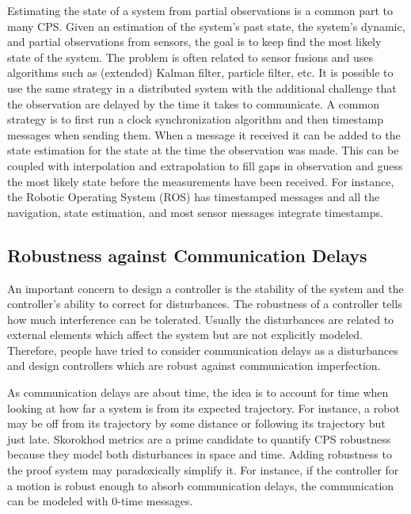 \documentclass[
graybox,
envcountchap
]{svmult}
\begin{document}
\begin{bibunit}
    Estimating the state of a system from partial observations is a common part to many CPS.
    Given an estimation of the system's past state, the system's dynamic, and partial observations from sensors, the goal is to keep find the most likely state of the system.
    The problem is often related to sensor fusions and uses algorithms such as (extended) Kalman filter, particle filter, etc.
    It is possible to use the same strategy in a distributed system with the additional challenge that the observation are delayed by the time it takes to communicate.
    A common strategy is to first run a clock synchronization algorithm and then timestamp messages when sending them.
    When a message it received it can be added to the state estimation for the state at the time the observation was made.
    This can be coupled with interpolation and extrapolation to fill gaps in observation and guess the most likely state before the measurements have been received.
    For instance, the Robotic Operating System (ROS) \cite{ROS} has timestamped messages and all the navigation, state estimation, and most sensor messages integrate timestamps.
   
    \subsection{Robustness against Communication Delays}

    An important concern to design a controller is the stability of the system and the controller's ability to correct for disturbances.
    The robustness of a controller tells how much interference can be tolerated.
    Usually the disturbances are related to external elements which affect the system but are not explicitly modeled.
    Therefore, people have tried to consider communication delays as a disturbances and design controllers which are robust against communication imperfection.

    As communication delays are about time, the idea is to account for time when looking at how far a system is from its expected trajectory.
    For instance, a robot may be off from its trajectory by some distance or following its trajectory but just late.
    Skorokhod metrics \cite{DBLP:conf/cav/DeshmukhMP15,DBLP:conf/hybrid/MajumdarP15,DBLP:conf/cyphy/KidoSH17,DBLP:conf/adhs/KidoSH18} are a prime candidate to quantify CPS robustness because they model both disturbances in space and time.
    Adding robustness to the proof system may paradoxically simplify it.
    For instance, if the controller for a motion is robust enough to absorb communication delays, the communication can be modeled with 0-time messages.


\end{bibunit}
\end{document}
